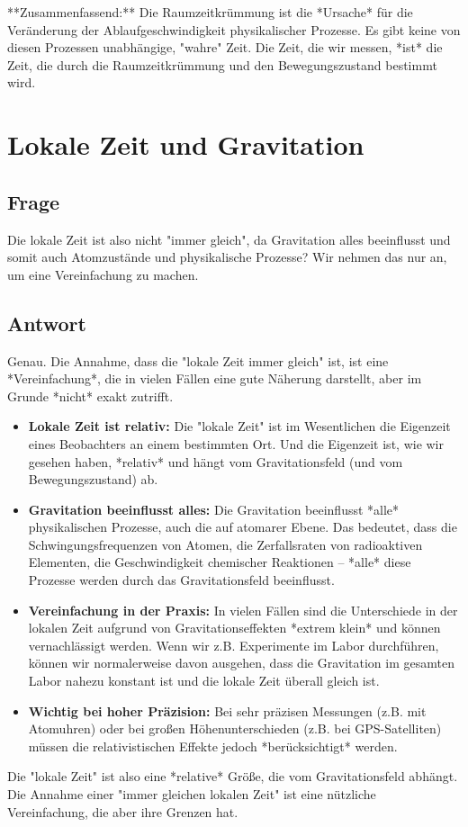 \documentclass{article}
\begin{document}
	**Zusammenfassend:** Die Raumzeitkrümmung ist die *Ursache* für die Veränderung der Ablaufgeschwindigkeit physikalischer Prozesse. Es gibt keine von diesen Prozessen unabhängige, "wahre" Zeit. Die Zeit, die wir messen, *ist* die Zeit, die durch die Raumzeitkrümmung und den Bewegungszustand bestimmt wird.
	
	\section{Lokale Zeit und Gravitation}
	
	\subsection{Frage}
	Die lokale Zeit ist also nicht "immer gleich", da Gravitation alles beeinflusst und somit auch Atomzustände und physikalische Prozesse? Wir nehmen das nur an, um eine Vereinfachung zu machen.
	
	\subsection{Antwort}
	Genau. Die Annahme, dass die "lokale Zeit immer gleich" ist, ist eine *Vereinfachung*, die in vielen Fällen eine gute Näherung darstellt, aber im Grunde *nicht* exakt zutrifft.
	\begin{itemize}
		\item \textbf{Lokale Zeit ist relativ:} Die "lokale Zeit" ist im Wesentlichen die Eigenzeit eines Beobachters an einem bestimmten Ort.  Und die Eigenzeit ist, wie wir gesehen haben, *relativ* und hängt vom Gravitationsfeld (und vom Bewegungszustand) ab.
		\item \textbf{Gravitation beeinflusst alles:} Die Gravitation beeinflusst *alle* physikalischen Prozesse, auch die auf atomarer Ebene.  Das bedeutet, dass die Schwingungsfrequenzen von Atomen, die Zerfallsraten von radioaktiven Elementen, die Geschwindigkeit chemischer Reaktionen – *alle* diese Prozesse werden durch das Gravitationsfeld beeinflusst.
		\item \textbf{Vereinfachung in der Praxis:} In vielen Fällen sind die Unterschiede in der lokalen Zeit aufgrund von Gravitationseffekten *extrem klein* und können vernachlässigt werden.  Wenn wir z.B. Experimente im Labor durchführen, können wir normalerweise davon ausgehen, dass die Gravitation im gesamten Labor nahezu konstant ist und die lokale Zeit überall gleich ist.
		\item \textbf{Wichtig bei hoher Präzision:} Bei sehr präzisen Messungen (z.B. mit Atomuhren) oder bei großen Höhenunterschieden (z.B. bei GPS-Satelliten) müssen die relativistischen Effekte jedoch *berücksichtigt* werden.
	\end{itemize}
	Die "lokale Zeit" ist also eine *relative* Größe, die vom Gravitationsfeld abhängt. Die Annahme einer "immer gleichen lokalen Zeit" ist eine nützliche Vereinfachung, die aber ihre Grenzen hat.
	
\end{document}

